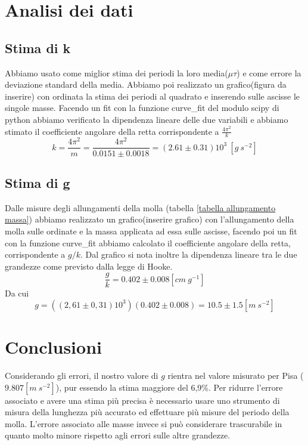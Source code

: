 \documentclass{article}
\begin{document}
	\section{Analisi dei dati}
		\subsection{Stima di k}
			Abbiamo usato come miglior stima dei periodi la loro media($\mu\tau$) e come errore la deviazione standard della media. Abbiamo poi realizzato un grafico(figura da inserire) con ordinata la stima dei periodi al quadrato e inserendo sulle ascisse le singole masse. Facendo un fit con la funzione curve\_fit del modulo scipy di python abbiamo verificato la dipendenza lineare delle due variabili e abbiamo stimato il coefficiente angolare della retta corrispondente a $\frac{4\pi^2}{k}$
			\begin{equation}
				k = \frac{4\pi^2}{m} =\frac{4\pi^2}{0.0151\pm0.0018} = (2.61\pm0.31)10^3\:[g\:s^{-2}]
			\end{equation}
			
		\subsection{Stima di g}
			Dalle misure degli allungamenti della molla (tabella \ref{tabella allungamento massa}) abbiamo realizzato un grafico(inserire grafico) con l'allungamento della molla sulle ordinate e la massa applicata ad essa sulle ascisse, facendo poi un fit con la funzione curve\_fit abbiamo calcolato il coefficiente angolare della retta, corrispondente a $g/k$. Dal grafico si nota inoltre la dipendenza lineare tra le due grandezze come previsto dalla legge di Hooke.
			\begin{equation}
				\frac{g}{k} = 0.402\pm0.008 [cm\:g^{-1}]
			\end{equation}
			Da cui
			\begin{equation}
				g = ((2,61\pm0,31)10^3)(0.402\pm0.008) = 10.5 \pm 1.5[m\:s^{-2}]
			\end{equation}
	
	\section{Conclusioni}
		Considerando gli errori, il nostro valore di $g$ rientra nel valore misurato per Pisa ($9.807 [m\:s^{-2}]$), pur essendo la stima maggiore del 6,9\%. Per ridurre l'errore associato e avere una stima pi\`{u} precisa \`{e} necessario usare uno strumento di misura della lunghezza pi\`{u} accurato ed effettuare pi\`{u} misure del periodo della molla. L'errore associato alle masse invece si pu\`{o} considerare trascurabile in quanto molto minore rispetto agli errori sulle altre grandezze.
\end{document}
